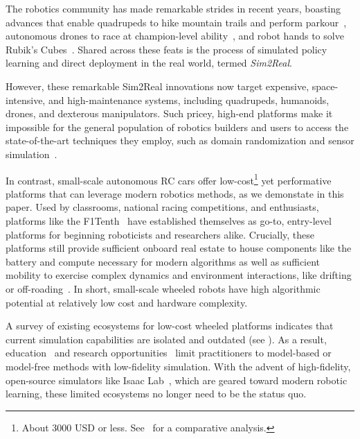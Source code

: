 The robotics community has made  remarkable strides in recent years, boasting  advances that enable quadrupeds to hike mountain trails and perform parkour~\cite{miki_learning_2022, hoeller_anymal_2024}, autonomous drones to race at champion-level ability~\cite{kaufmann_champion-level_2023}, and robot hands to solve Rubik's Cubes~\cite{openai_solving_2019}. Shared across these feats is the process of simulated policy learning and direct deployment in the real world, termed \textit{Sim2Real}.

However, these remarkable Sim2Real innovations now target expensive, space-intensive, and high-maintenance systems, including quadrupeds, humanoids, drones, and dexterous manipulators. Such pricey, high-end platforms make it impossible for the general population of robotics builders and users to access the state-of-the-art techniques they employ, such as domain randomization and sensor simulation~\cite{kaufmann_champion-level_2023, huang_datt_2023, liao_berkeley_2024, hoeller_anymal_2024}.

In contrast, small-scale autonomous RC cars offer low-cost\footnote{About 3000 USD or less. See~\cite{samak_autodrive_2023} for a comparative analysis.} yet performative platforms that can leverage modern robotics methods, as we demonstate in this paper. Used by classrooms, national racing competitions, and enthusiasts, 
platforms like the F1Tenth~\cite{okelly_f1tenth_2020} have established themselves as go-to, entry-level platforms for beginning roboticists and researchers alike. Crucially, these platforms still provide sufficient onboard real estate to house components like the battery and compute necessary for modern algorithms as well as sufficient mobility to exercise complex dynamics and environment interactions, like drifting or off-roading~\cite{williams_information_2017, han_model_2024, han_dynamics_2024, datar_toward_2024}. In short, small-scale wheeled robots have high algorithmic potential at relatively low cost and hardware complexity.

A survey of existing ecosystems for low-cost wheeled platforms indicates that current simulation capabilities are isolated and outdated
(see ). As a result, education~\cite{horvath_teaching_2024} and research opportunities~\cite{evans_unifying_2024} limit practitioners to model-based or model-free methods with low-fidelity simulation. With the advent of high-fidelity, open-source simulators like Isaac Lab~\cite{mittal_orbit_2023}, which are geared toward modern robotic learning, these limited ecosystems no longer need to be the status quo.

